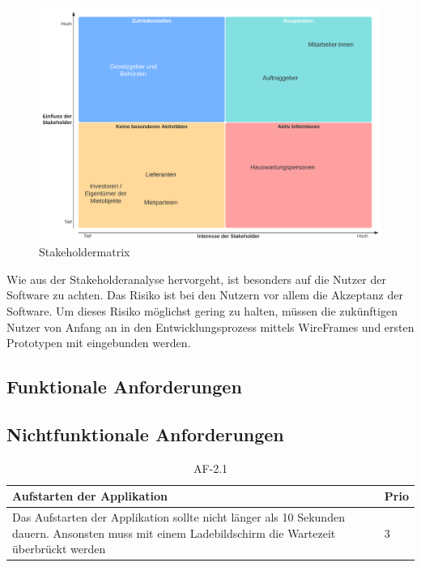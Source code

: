 \begin{figure}[H]
  \begin{center}
      \includegraphics[width=0.9\linewidth]{content/images/Stakeholdematrix.png}
      \caption{Stakeholdermatrix}
      \label{fig:Stakeholdermatrix}
    \end{center}
\end{figure}

Wie aus der Stakeholderanalyse hervorgeht, ist besonders auf die Nutzer der Software zu achten. Das Risiko ist bei den Nutzern vor allem die Akzeptanz der Software. Um dieses Risiko möglichst gering zu halten, müssen die zukünftigen Nutzer von Anfang an in den Entwicklungsprozess mittels WireFrames und ersten Prototypen mit eingebunden werden.

\subsection{Funktionale Anforderungen}

\subsection{Nichtfunktionale Anforderungen}
\begin{table}[ht]
  \centering
  \settowidth{}
  \setlength\extrarowheight{2pt}
  \begin{tabulary}{1.0\textwidth}{|m{16cm}|L|}
    \hline
    \textbf{Aufstarten der Applikation}&\textbf{Prio}\\
    \hline
    Das Aufstarten der Applikation sollte nicht länger als 10 Sekunden dauern. Ansonsten muss mit einem Ladebildschirm die Wartezeit überbrückt werden & 3\\ 
    \hline
  \end{tabulary}
  \caption{AF-2.1}
  \label{af2.1}
\end{table}

